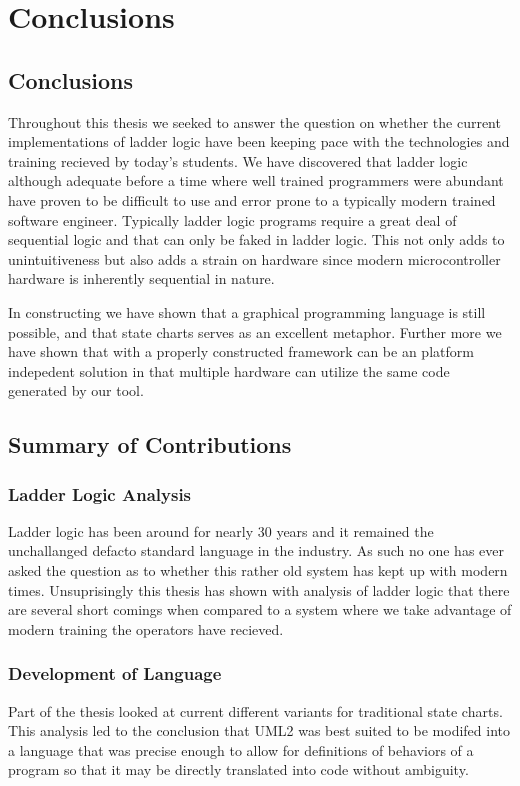 \section{Conclusions}

\subsection{Conclusions}

Throughout this thesis we seeked to answer the question on whether the current implementations of ladder logic have been keeping pace with the technologies and training recieved by today's students. We have discovered that ladder logic although adequate before a time where well trained programmers were abundant have proven to be difficult to use and error prone to a typically modern trained software engineer. Typically ladder logic programs require a great deal of sequential logic and that can only be faked in ladder logic. This not only adds to unintuitiveness but also adds a strain on hardware since modern microcontroller hardware is inherently sequential in nature.

In constructing \plccharts we have shown that a graphical programming language is still possible, and that state charts serves as an excellent metaphor. Further more we have shown that with a properly constructed framework \plccharts can be an platform indepedent solution in that multiple hardware can utilize the same  code generated by our tool. 


\subsection{Summary of Contributions}

\subsubsection{Ladder Logic Analysis}
Ladder logic has been around for nearly 30 years and it remained the unchallanged defacto standard language in the industry. As such no one has ever asked the question as to whether this rather old system has kept up with modern times. Unsuprisingly this thesis has shown with analysis of ladder logic that there are several short comings when compared to a system where we take advantage of modern training the operators have recieved. 


\subsubsection{Development of \plccharts Language}
Part of the thesis looked at current different variants for traditional state charts. This analysis led to the conclusion that UML2 was best suited to be modifed into a language that was precise enough to allow for definitions of behaviors of a program so that it may be directly translated into code without ambiguity.

